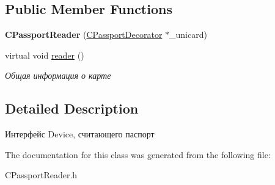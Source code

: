 \subsection*{Public Member Functions}
\begin{DoxyCompactItemize}
\item 
\mbox{\label{classCPassportReader_acda8f2f99e534bbe80f96cab38e80ab9}} 
{\bfseries C\+Passport\+Reader} (\hyperlink{classCPassportDecorator}{C\+Passport\+Decorator} $\ast$\+\_\+unicard)
\item 
\mbox{\label{classCPassportReader_a62ed2b4972b4cebd1ebaeb594d04fa9c}} 
virtual void \hyperlink{classCPassportReader_a62ed2b4972b4cebd1ebaeb594d04fa9c}{reader} ()
\begin{DoxyCompactList}\small\item\em Общая информация о карте \end{DoxyCompactList}\end{DoxyCompactItemize}


\subsection{Detailed Description}
Интерфейс Device, считающего паспорт 

The documentation for this class was generated from the following file\+:\begin{DoxyCompactItemize}
\item 
C\+Passport\+Reader.\+h\end{DoxyCompactItemize}
